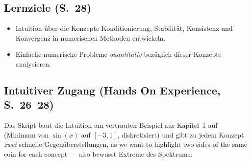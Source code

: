 \subsection{Lernziele (S.~28)}
\begin{itemize}[nosep]
  \item Intuition über die Konzepte Konditionierung, Stabilität, Konsistenz und Konvergenz in numerischen Methoden entwickeln.
  \item Einfache numerische Probleme \emph{quantitativ} bezüglich dieser Konzepte analysieren.
\end{itemize}

\subsection{Intuitiver Zugang (Hands On Experience, S.~26--28)}
Das Skript baut die Intuition am vertrauten Beispiel aus Kapitel~1 auf (Minimum von $\sin(x)$ auf $[-3,1]$, diskretisiert) und gibt zu jedem Konzept \emph{zwei} schnelle Gegenüberstellungen, \glqq as we want to highlight two sides of the same coin for each concept\grqq{} — also bewusst Extreme des Spektrums:

